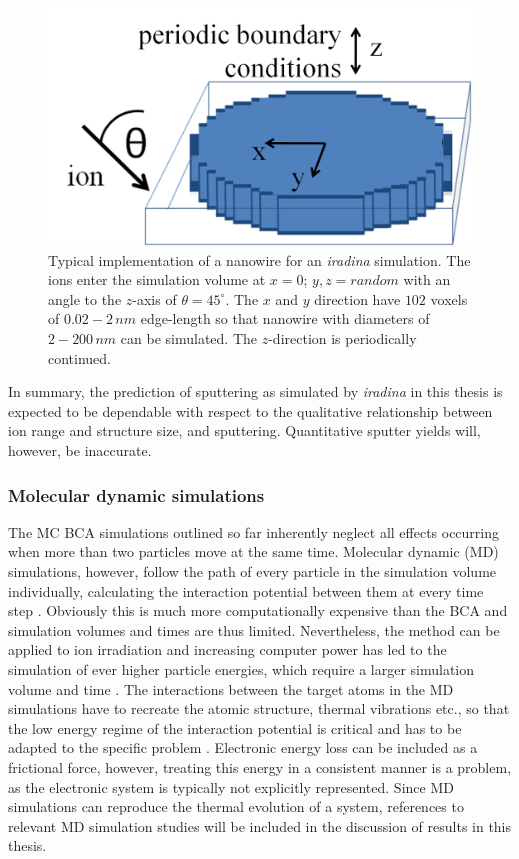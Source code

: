 \begin{figure}
	\centering
		\includegraphics[width=.5\textwidth]{images/voxel.jpg}
	\caption{Typical implementation of a nanowire for an \emph{iradina} simulation. The ions enter the simulation volume at $x=0$; $y,z=random$ with an angle to the $z$-axis of $\theta = 45^\circ$. The $x$ and $y$ direction have $102$ voxels of $0.02-2\,nm$ edge-length so that nanowire with diameters of $2-200\,nm$ can be simulated. The $z$-direction is periodically continued.}
	\label{voxel}
\end{figure} 

In summary, the prediction of sputtering as simulated by \emph{iradina} in this thesis is expected to be dependable with respect to the qualitative relationship between ion range and structure size, and sputtering. Quantitative sputter yields will, however, be inaccurate.


\subsubsection{Molecular dynamic simulations}

The MC BCA simulations outlined so far inherently neglect all effects occurring when more than two particles move at the same time. Molecular dynamic (MD) simulations, however, follow the path of every particle in the simulation volume individually, calculating the interaction potential between them at every time step \cite{alder_studies_1959}. Obviously this is much more computationally expensive than the BCA and simulation volumes and times are thus limited. Nevertheless, the method can be applied to ion irradiation \cite{nordlund_molecular_1995} and increasing computer power has led to the simulation of ever higher particle energies, which require a larger simulation volume and time \cite{greaves_enhanced_2013,baumer_prediction_2014,anders_sputtering_2015}. The interactions between the target atoms in the MD simulations have to recreate the atomic structure, thermal vibrations etc., so that the low energy regime of the interaction potential is critical and has to be adapted to the specific problem \cite{dedkov_interatomic_1995,nordlund_repulsive_1997,albe_modeling_2002,nordlund_interatomic_2008,primetzhofer_inelastic_2012,primetzhofer_local_2013}. Electronic energy loss can be included as a frictional force, however, treating this energy in a consistent manner is a problem, as the electronic system is typically not explicitly represented. Since MD simulations can reproduce the thermal evolution of a system, references to relevant MD simulation studies will be included in the discussion of results in this thesis.


